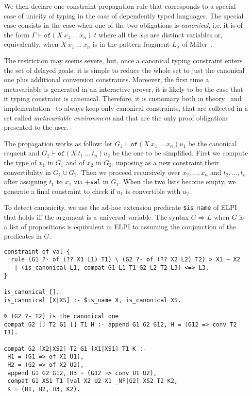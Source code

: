 \documentclass{easychair}
\begin{document}
We then declare one constraint propagation rule that corresponds to a special case of unicity of typing in the case of dependently typed languages. The special case consists in the case when one of the two obligations is \emph{canonical}, i.e. it is of the form $\Gamma \vdash \mathtt{of} (X~x_1~\ldots~x_n)~t$ where all the $x_i$s are distinct variables or, equivalently, when $X~x_1~\ldots~x_n$ is in the pattern fragment $L_\lambda$ of Miller~\cite{patternfragment}.

The restriction may seems severe, but, once a canonical typing constraint enters the set of delayed goals, it is simple to reduce the whole set to just the canonical one plus additional conversion constraints. Moreover, the first time a metavariable is generated in an interactive prover, it is likely to be the case that it typing constraint is canonical. Therefore, it is customary both in theory~\cite{???} and implementation~\cite{???} to always keep only canonical constraints, that are collected in a set called \emph{metavariable environment} and that are the only proof obligations presented to the user.

The propagation works as follow: let $G_1 \vdash \mathtt{of} (X~x_1~\ldots~x_n) u_1$ be the canonical sequent and $G_2 \vdash \mathtt{of} (X~t_1~\ldots~t_n) u_2$ be the one to be simplified. First we compute the type of $x_1$ in $G_1$ and of $x_2$ in $G_2$, imposing as a new constraint their convertibility in $G_1 \cup G_2$. Then we proceed recursively over $x_2,\ldots,x_n$ and $t_2,\ldots,t_n$ after assigning $t_1$ to $x_1$ via +\verb+val+ in $G_1$. When the two lists become empty, we generate a final constraint to check if $u_1$ is convertible with $u_2$.

To detect canonicity, we use the ad-hoc extension predicate \verb+$is_name+ of ELPI that holds iff the argument is a universal variable. The syntax $G \Rightarrow L$ when $G$ is a list of propositions is equivalent in ELPI to assuming the conjunction of the predicates in $G$.

\begin{verbatim}
constraint of val {
  rule (G1 ?- of (?? X1 L1) T1) \ (G2 ?- of (?? X2 L2) T2) > X1 ~ X2
   | (is_canonical L1, compat G1 L1 T1 G2 L2 T2 L3) <=> L3.
}

is_canonical [].
is_canonical [X|XS] :- $is_name X, is_canonical XS.

% (G2 ?- T2) is the canonical one
compat G2 [] T2 G1 [] T1 H :- append G1 G2 G12, H = (G12 => conv T2 T1).

compat G2 [X2|XS2] T2 G1 [X1|XS1] T1 K :-
 H1 = (G1 => of X1 U1),
 H2 = (G2 => of X2 U2),
 append G1 G2 G12, H3 = (G12 => conv U1 U2),
 compat G1 XS1 T1 [val X2 U2 X1 _NF|G2] XS2 T2 K2,
 K = (H1, H2, H3, K2).
\end{verbatim}
\end{document}
